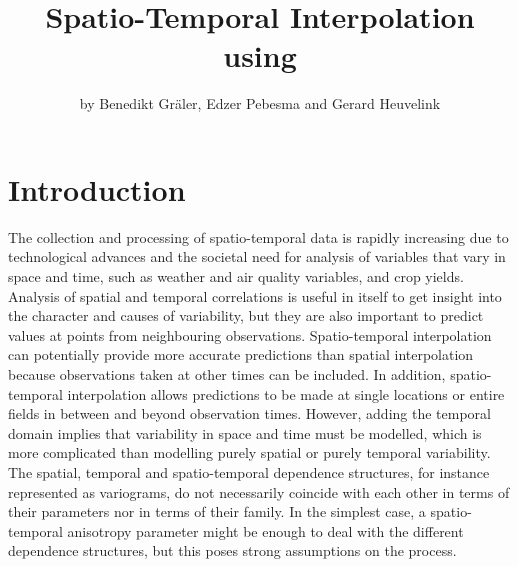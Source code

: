 
\newcommand{\rev}[1]{{\color{red} #1}}


\title{Spatio-Temporal Interpolation using }

\author{by Benedikt Gr{\"a}ler, Edzer Pebesma and Gerard Heuvelink}

\graphicspath{{figures/}}

\maketitle


\section{Introduction}\label{sec:intro}
The collection and processing of spatio-temporal data is rapidly increasing due to technological advances and the societal need for analysis of variables that vary in space and time, such as weather and air quality variables, and crop yields. Analysis of spatial and temporal correlations is useful in itself to get insight into the character and causes of variability, but they are also important to predict values at points from neighbouring observations. Spatio-temporal interpolation can potentially provide more accurate predictions than spatial interpolation because observations taken at other times can be included. In addition, spatio-temporal interpolation allows predictions to be made at single locations or entire fields in between and beyond observation times. However, adding the temporal domain implies that variability in space and time must be modelled, which is more complicated than modelling purely spatial or purely temporal variability. The spatial, temporal and spatio-temporal dependence structures, for instance represented as variograms, do not necessarily coincide with each other in terms of their parameters nor in terms of their family. In the simplest case, a spatio-temporal anisotropy parameter might be enough to deal with the different dependence structures, but this poses strong assumptions on the process. 

